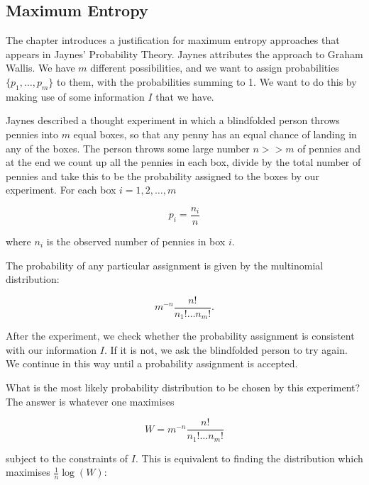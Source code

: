 \documentclass[
]{book}
\begin{document}
\hypertarget{maximum-entropy}{%
\subsection*{Maximum Entropy}\label{maximum-entropy}}

The chapter introduces a justification for maximum entropy approaches that appears in Jaynes' Probability Theory. Jaynes attributes the approach to Graham Wallis. We have \(m\) different possibilities, and we want to assign probabilities \(\{ p_1, \dots, p_m \}\) to them, with the probabilities summing to 1. We want to do this by making use of some information \(I\) that we have.

Jaynes described a thought experiment in which a blindfolded person throws pennies into \(m\) equal boxes, so that any penny has an equal chance of landing in any of the boxes. The person throws some large number \(n >> m\) of pennies and at the end we count up all the pennies in each box, divide by the total number of pennies and take this to be the probability assigned to the boxes by our experiment. For each box \(i = 1,2,\dots,m\)

\[
p_i = \frac{n_i}{n} 
\]

where \(n_i\) is the observed number of pennies in box \(i\).

The probability of any particular assignment is given by the multinomial distribution:

\[
m^{-n} \frac{n!}{n_1! \dots n_m!}.
\]

After the experiment, we check whether the probability assignment is consistent with our information \(I\). If it is not, we ask the blindfolded person to try again. We continue in this way until a probability assignment is accepted.

What is the most likely probability distribution to be chosen by this experiment? The answer is whatever one maximises

\[
W = m^{-n} \frac{n!}{n_1! \dots n_m!}
\]

subject to the constraints of \(I\). This is equivalent to finding the distribution which maximises \(\frac{1}{n} \log(W)\):
\end{document}
